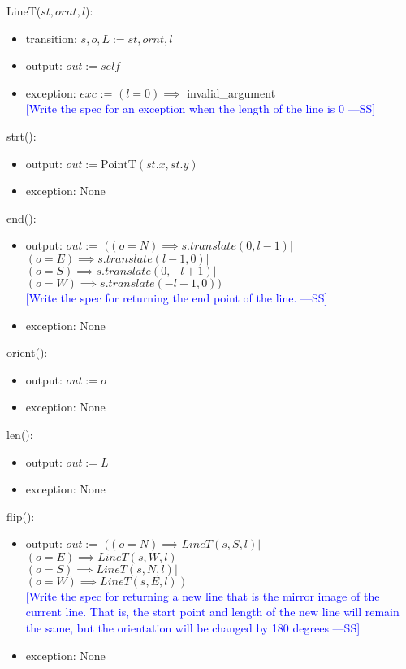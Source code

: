 \documentclass[12pt]{article}
\newcommand{\authornote}[3]{\textcolor{#1}{[#3 ---#2]}}
\newcommand{\authornote}[3]{}
\newcommand{\wss}[1]{\authornote{blue}{SS}{#1}}
\begin{document}
LineT($st, ornt, l$):
\begin{itemize}
\item transition: $s, o, L := st, ornt, l$
\item output: $out := \mathit{self}$
\item exception: $exc$ := $(l = 0) \implies$ invalid\_argument\\
\wss{Write the spec for an exception when the length of the line is 0}
\end{itemize}

\noindent strt():
\begin{itemize}
\item output: $out := \mbox{PointT}(st.x, st.y)$
\item exception: None
\end{itemize}

\noindent end():
\begin{itemize}
\item output:  $out :=$ $((o = N) \implies s.translate(0, l-1)|$\\
					  $(o = E) \implies s.translate(l-1, 0)|$\\
					  $(o = S) \implies s.translate(0, -l+1)|$\\
				   	  $(o = W) \implies s.translate(-l+1, 0))$\\
\wss{Write the spec for returning the end point of the line.}

\item exception: None
\end{itemize}

\noindent orient():
\begin{itemize}
\item output: $out := o$
\item exception: None
\end{itemize}

\noindent len():
\begin{itemize}
\item output: $out := L$
\item exception: None
\end{itemize}

\noindent flip():
\begin{itemize}
\item output:  $out :=$ $((o = N) \implies LineT(s, S, l)|$\\
					  $(o = E) \implies LineT(s, W, l)|$\\
					  $(o = S) \implies LineT(s, N, l)|$\\
				   	  $(o = W) \implies LineT(s, E, l)|)$\\
\wss{Write the spec for returning a new line that is the mirror
    image of the current line.  That is, the start point and length of the new
    line will remain the same, but the orientation will be changed by 180
    degrees}
\item exception: None
\end{itemize}
\end{document}
